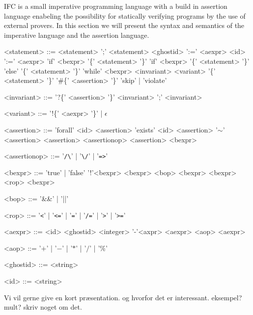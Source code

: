 IFC is a small imperative programming language with a build in assertion language enabeling the possibility for statically verifying programs by the use of external provers. In this section we will present the syntax and semantics of the imperative language and the assertion language.
\begin{table}[h!]
\begin{grammar}
<statement> ::= <statement> ';' <statement>
\alt <ghostid> ':=' <aexpr>
\alt <id> ':=' <aexpr>
\alt 'if' <bexpr> '\{' <statement> '\}'
\alt 'if' <bexpr> '\{' <statement> '\}' 'else' '\{' <statement> '\}'
\alt 'while' <bexpr> <invariant> <variant> '\{' <statement> '\}'
\alt '\#\{' <assertion> '\}'
\alt 'skip' | 'violate'

<invariant> ::= '?\{' <assertion> '\}'
\alt <invariant> ';' <invariant>

<variant> ::= '!\{' <aexpr> '\}' | $\epsilon$

<assertion> ::= 'forall' <id> <assertion>
\alt 'exists' <id> <assertion>
\alt '$\sim$' <assertion>
\alt <assertion> <assertionop> <assertion>
\alt <bexpr>

<assertionop> ::= '\verb|/\|' | '\verb|\/|' | '\verb|=>|'

<bexpr> ::= 'true' | 'false'
\alt '!'<bexpr>
\alt <bexpr> <bop> <bexpr>
\alt <bexpr> <rop> <bexpr>

<bop> ::= '\&\&' | '||'

<rop> ::= '\verb|<|' | '\verb|<=|' | '\verb|=|' | '\verb|/=|' | '\verb|>|' | '\verb|>=|'

<aexpr> ::= <id>
\alt <ghostid>
\alt <integer>
\alt '-'<axpr>
\alt <aexpr> <aop> <aexpr>

<aop> ::= '$+$' | '$-$' | '$*$' | '$/$' | '\%'

<ghostid> ::=  <string>

<id> ::= <string>
\end{grammar}
\caption{Grammar of IFC}
\label{table:grammar}
\end{table}

Vi vil gerne give en kort præsentation. og hvorfor det er interessant.
eksempel? mult?
skriv noget om det.
